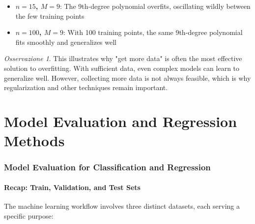 \documentclass[11pt,a4paper]{article}
\theoremstyle{definition}
\theoremstyle{plain}
\theoremstyle{remark}
\newtheorem*{observation}{Osservazione}
\begin{document}
\begin{itemize}
    \item \textbf{$n = 15$, $M = 9$}: The 9th-degree polynomial overfits, oscillating wildly between the few training points
    \item \textbf{$n = 100$, $M = 9$}: With 100 training points, the same 9th-degree polynomial fits smoothly and generalizes well
\end{itemize}

\begin{observation}
This illustrates why "get more data" is often the most effective solution to overfitting. With sufficient data, even complex models can learn to generalize well. However, collecting more data is not always feasible, which is why regularization and other techniques remain important.
\end{observation}



\newpage

\part{Model Evaluation and Regression Methods}

\section{Model Evaluation for Classification and Regression}

\subsection{Recap: Train, Validation, and Test Sets}

The machine learning workflow involves three distinct datasets, each serving a specific purpose:
\end{document}

